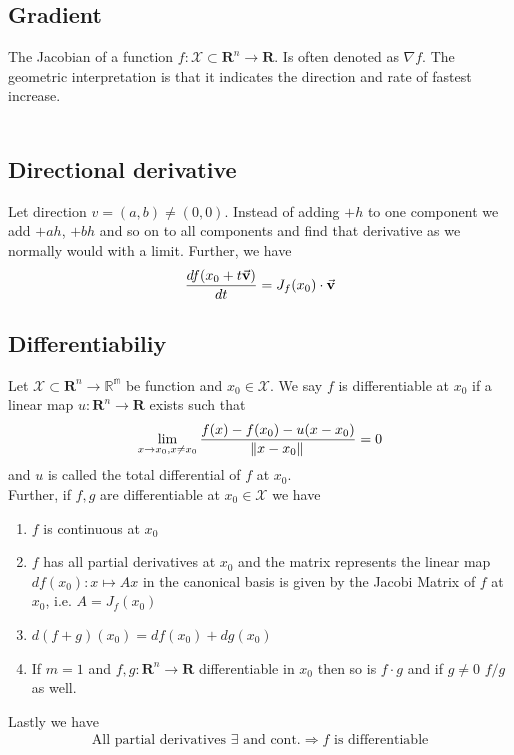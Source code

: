 \documentclass[8pt]{extarticle}
\newcommand{\R}{{\mathbb R}}
\newcommand{\X}{{\mathcal X}}
\newcommand{\ra}{{\rightarrow}}
\def\R{\mathbf{R}}
\begin{document}
\begin{multicols*}{3}
  \subsection{Gradient}
  The Jacobian of a function
  $f: \X \subset \R^n \ra \R$.
  Is often denoted as $\nabla f$. The geometric
  interpretation is that it indicates the
  direction and rate of fastest increase.\\ \\
  \subsection{Directional derivative}
  Let direction $v = (a, b) \neq (0, 0)$. Instead of
  adding $+h$ to one component we add $+ah$, $+bh$ and
  so on to all components and find that derivative as
  we normally would with a limit.
  Further, we have
  \begin{align*}
    \frac{df(x_0 + t \vectorarrow{v})}{dt} = J_f(x_0) \cdot \vectorarrow{v}
  \end{align*}
  \subsection{Differentiabiliy}
  Let $\X \subset \R^n \ra \mathbb{R^m}$ be function
  and $x_0 \in \X$. We say $f$ is differentiable at $x_0$ if a linear map
  $u: \R^n \ra \R$ exists such that
  \begin{align*}
    \lim_{x \ra x_0, x \neq x_0} \frac{f(x) - f(x_0) - u(x - x_0)}{\norm*{x - x_0}} = 0
  \end{align*}
  and $u$ is called the total differential of $f$ at $x_0$.\\
  Further, if $f, g$ are differentiable at $x_0 \in \X$
  we have
  \begin{enumerate}[label=(\arabic*)]
    \item $f$ is continuous at $x_0$
    \item $f$ has all partial derivatives at $x_0$ and the
          matrix represents the linear map $df(x_0): x \mapsto Ax$
          in the canonical basis is given by the Jacobi Matrix of $f$
          at $x_0$, i.e. $A = J_f(x_0)$
    \item $d(f + g)(x_0) = df(x_0) + dg(x_0)$
    \item If $m = 1$ and $f, g: \R^n \ra \R$
          differentiable in $x_0$ then so is $f \cdot g$
          and if $g \neq 0$ $f / g$ as well.
  \end{enumerate}
  Lastly we have
  \begin{align*}
    \text{All partial derivatives $\exists$ and cont.}
    \Rightarrow f \text{ is differentiable} \\
  \end{align*}

\end{multicols*}
\end{document}
